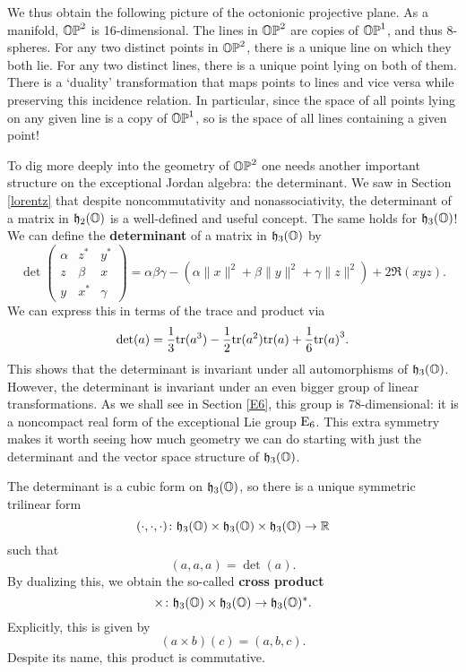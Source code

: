 We thus obtain the following picture of the octonionic projective plane.
As a manifold, ${\mathbb {OP}}^2$ is 16-dimensional.  The lines in ${\mathbb {OP}}^2$ are
copies of ${\mathbb {OP}}^1$, and thus 8-spheres.  For any two distinct points in
${\mathbb {OP}}^2$, there is a unique line on which they both lie.  For any two
distinct lines, there is a unique point lying on both of them.  There is
a `duality' transformation that maps points to lines and vice versa
while preserving this incidence relation.  In particular, since the
space of all points lying on any given line is a copy of ${\mathbb {OP}}^1$, so 
is the space of all lines containing a given point!

To dig more deeply into the geometry of ${\mathbb {OP}}^2$ one needs another
important structure on the exceptional Jordan algebra: the determinant. 
We saw in Section \ref{lorentz} that despite noncommutativity and
nonassociativity, the determinant of a matrix in ${\mathfrak {h}}_2({\mathbb O})$ is a
well-defined and useful concept.  The same holds for ${\mathfrak {h}}_3({\mathbb O})$!   We
can define the {\bf determinant} of a matrix in ${\mathfrak {h}}_3({\mathbb O})$ by
\[ 
\det \left( \begin{array}{ccc}  
                         \alpha  &  z^*  & y^*         \\  
                         z       & \beta & x           \\ 
                         y       & x^* & \gamma   \end{array} \right) = 
\alpha \beta \gamma - (\alpha \|x\|^2 + \beta \|y\|^2 + \gamma \|z\|^2)
+ 2 \Re(xyz) .
\]  
We can express this in terms of the trace and product via
\[   \det(a) = {1\over 3} {\rm tr}(a^3) - {1\over 2} {\rm tr}(a^2) {\rm tr}(a) + 
               {1\over 6} {{\rm tr}(a)}^3  .\]
This shows that the determinant is invariant under all automorphisms of
${\mathfrak {h}}_3({\mathbb O})$.  However, the determinant is invariant under an even bigger
group of linear transformations.  As we shall see in Section \ref{E6},
this group is 78-dimensional: it is a noncompact real form of the
exceptional Lie group ${\rm E}_6$.  This extra symmetry makes it worth
seeing how much geometry we can do starting with just the determinant
and the vector space structure of ${\mathfrak {h}}_3({\mathbb O})$.  

The determinant is a cubic form on ${\mathfrak {h}}_3({\mathbb O})$, so there is a unique
symmetric trilinear form 
\[  (\cdot,\cdot,\cdot) \colon {\mathfrak {h}}_3({\mathbb O}) \times {\mathfrak {h}}_3({\mathbb O}) \times {\mathfrak {h}}_3({\mathbb O})
\to {\mathbb R} \]
such that
\[      (a,a,a) = \det(a) .\]
By dualizing this, we obtain the so-called {\bf cross product}
\[  \times \colon {\mathfrak {h}}_3({\mathbb O}) \times {\mathfrak {h}}_3({\mathbb O}) \to {\mathfrak {h}}_3({\mathbb O})^*. \]
Explicitly, this is given by
\[     (a \times b)(c) = (a,b,c) .\]
Despite its name, this product is commutative.  

